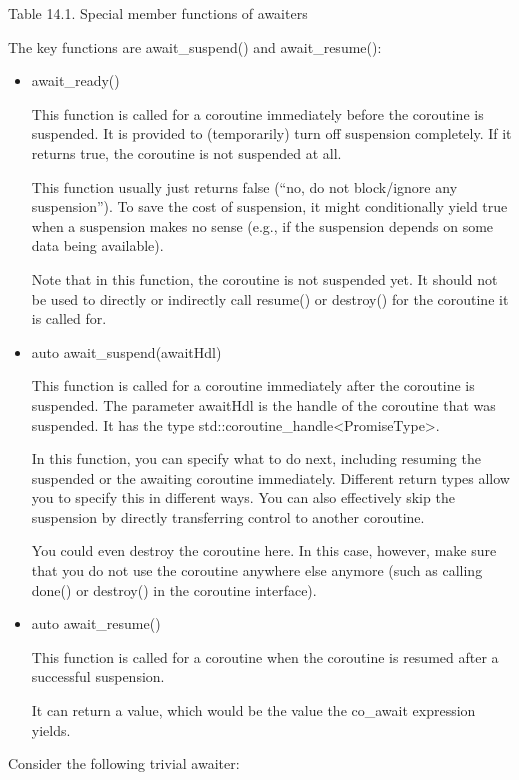 \begin{center}
Table 14.1. Special member functions of awaiters
\end{center}

The key functions are await\_suspend() and await\_resume():

\begin{itemize}
\item 
await\_ready()

This function is called for a coroutine immediately before the coroutine is suspended. It is provided to (temporarily) turn off suspension completely. If it returns true, the coroutine is not suspended at all.

This function usually just returns false (“no, do not block/ignore any suspension”). To save the cost of suspension, it might conditionally yield true when a suspension makes no sense (e.g., if the suspension depends on some data being available).

Note that in this function, the coroutine is not suspended yet. It should not be used to directly or indirectly call resume() or destroy() for the coroutine it is called for.

\item 
auto await\_suspend(awaitHdl)

This function is called for a coroutine immediately after the coroutine is suspended.
The parameter awaitHdl is the handle of the coroutine that was suspended. It has the type std::coroutine\_handle<PromiseType>.

In this function, you can specify what to do next, including resuming the suspended or the awaiting coroutine immediately. Different return types allow you to specify this in different ways. You can also effectively skip the suspension by directly transferring control to another coroutine.

You could even destroy the coroutine here. In this case, however, make sure that you do not use the coroutine anywhere else anymore (such as calling done() or destroy() in the coroutine interface).

\item 
auto await\_resume()

This function is called for a coroutine when the coroutine is resumed after a successful suspension.

It can return a value, which would be the value the co\_await expression yields.
\end{itemize}

Consider the following trivial awaiter:

